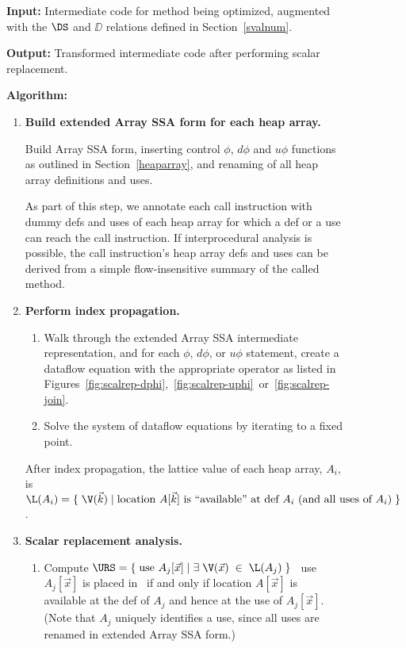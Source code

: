 
\begin{figure}
{\small
{\bf Input:} Intermediate code for method being optimized, augmented
with the $\DS$ and $\DD$ relations defined in Section~\ref{svalnum}.

\vspace{14pt}

{\bf Output:} Transformed intermediate code after performing scalar
replacement.

\vspace{14pt}

{\bf Algorithm:}
\begin{enumerate}

\item \label{item:arrayssa}
{\bf Build extended Array SSA form for each heap array.}

Build Array SSA form, inserting control $\phi$,
$d\phi$ and $u\phi$ functions as outlined in Section~\ref{heaparray},
and renaming of all heap array definitions and uses.

As part of this step, we annotate each call instruction with dummy
defs and uses of each heap array for which a def or a use can reach the call
instruction.  
If interprocedural analysis is possible, the call
instruction's heap array defs and uses can
be derived from a simple flow-insensitive
summary of the called method.  

\item \label{item:dflow}
{\bf Perform index propagation.}
\begin{enumerate}
\item Walk through the extended Array SSA intermediate representation,
and for each $\phi$, $d\phi$, or $u\phi$ statement, create a 
dataflow equation with the appropriate operator as listed in 
Figures~\ref{fig:scalrep-dphi},~\ref{fig:scalrep-uphi}~or~\ref{fig:scalrep-join}.
\item Solve the system of dataflow equations by iterating to a fixed point.
\end{enumerate}
After index propagation, the lattice value of each 
heap array, $A_i$,
is 
$\L(A_i) = \{\; \V(\vec{k}) \; | \;
\mbox{location $A[\vec{k}]$ is ``available'' at def $A_i$ (and all uses of $A_i$)} \; \}$.

\item \label{item:analysis}
{\bf Scalar replacement analysis.}

\begin{enumerate}
\item Compute $\URS = \{\; \mbox{use $A_j[\vec{x}]$} \; | \; \exists\; \V(\vec{x}) \; \in \; \L(A_j)\;\}$ \ie\
use $A_j[\vec{x}]$ is placed in \URS\ if and only if location $A[\vec{x}]$ is available
at the def of $A_j$ and hence at the use of $A_j[\vec{x}]$.
(Note that $A_j$ uniquely identifies a use, since all uses are renamed in
extended Array SSA form.)


\end{enumerate}
\end{enumerate}}
\end{figure}
